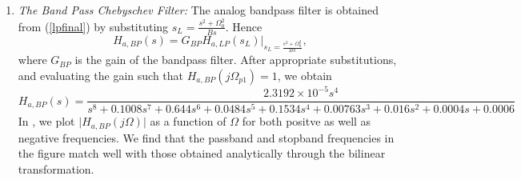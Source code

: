 \documentclass{article}
\begin{document}
\begin{enumerate}
\item {\em The Band Pass Chebyschev Filter:}  The analog bandpass filter is obtained from (\ref{lpfinal}) by substituting
$s_L = \frac{s^2 + \Omega_0^2}{Bs}$.  Hence
\begin{equation}
H_{a,BP}(s) = G_{BP}H_{a,LP}(s_L)\vert_{s_L = \frac{s^2 + \Omega_0^2}{Bs}},
\end{equation}
where $G_{BP}$ is the gain of the bandpass filter.  After appropriate substitutions, and evaluating the gain 
such that $H_{a,BP}(j\Omega_{p1}) = 1$, we obtain
{\tiny
\begin{equation}
\label{bpfinal}
H_{a,BP}(s) = \frac{2.3192\times 10^{-5}s^4}{s^8+0.1008s^7+0.644s^6+0.0484s^5+0.1534s^4+0.00763s^3+0.016s^2+0.0004s+0.0006}
\end{equation}
}
In , we plot $\vert H_{a,BP}(j\Omega)\vert$ as a function of $\Omega$ for both positve as
well as negative frequencies.  We find that the passband and stopband frequencies in the figure
match well with those obtained analytically through the bilinear transformation.
\end{enumerate}
\end{document}
